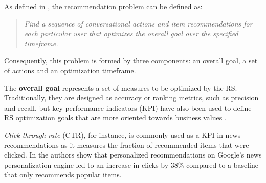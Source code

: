     As defined in \cite{2016BeyondMatrixCompletion}, the recommendation problem can be defined as: 

    \begin{quote}
      \textit{Find a sequence of conversational actions and item recommendations for each particular user that 
      optimizes the overall goal over the specified timeframe.}  
    \end{quote}
    
    Consequently, this problem is formed by three components: an overall goal, a set of actions and 
    an optimization timeframe. 

    The \textbf{overall goal} represents a set of measures to be optimized by the RS. Traditionally, they are designed 
    as accuracy or ranking metrics, such as precision and recall, but key performance indicators (KPI) have 
    also been used to define RS optimization goals that are more oriented towards business values \cite{2019BusinessValue}.


    
    \textit{Click-through rate} (CTR), for instance, is commonly used as a KPI in news 
    recommendations as it measures the fraction of recommended items that were clicked. 
    In \cite{2007GoogleNews} the authors show that personalized recommendations 
    on Google's news personalization engine led to an increase in clicks by $38\%$ compared 
    to a baseline that only recommends popular items. 


